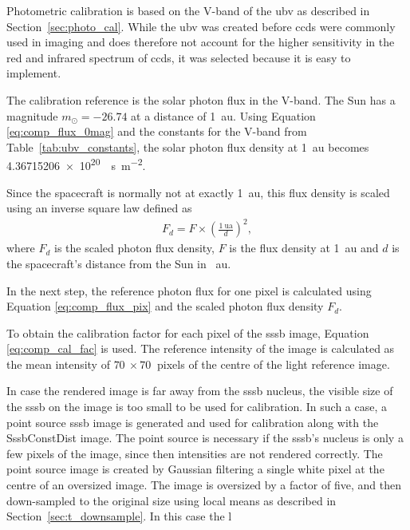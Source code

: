 Photometric calibration is based on the V-band of the \gls{ubv} as described in Section~\ref{sec:photo_cal}. While the \gls{ubv} was created before \glspl{ccd} were commonly used in imaging and does therefore not account for the higher sensitivity in the red and infrared spectrum of \glspl{ccd}, it was selected because it is easy to implement. 

The calibration reference is the solar photon flux in the V-band. The Sun has a magnitude $m_{\odot} = -26.74$ at a distance of \SI{1}{\astronomicalunit}. Using Equation \ref{eq:comp_flux_0mag} and the constants for the V-band from Table~\ref{tab:ubv_constants}, the solar photon flux density at \SI{1}{\astronomicalunit} becomes \SI{4.36715206e+20}{\per\second\per\square\meter}.
 
Since the spacecraft is normally not at exactly \SI{1}{\astronomicalunit}, this flux density is scaled using an inverse square law defined as
\begin{align}
    F_d = F \times \left(\frac{\SI{1}{\astronomicalunit}}{d}\right)^2, \label{eq:inverse_square}
\end{align}
where $F_d$ is the scaled photon flux density, $F$ is the flux density at \SI{1}{\astronomicalunit} and $d$ is the spacecraft's distance from the Sun in \SI{}{\astronomicalunit}.

In the next step, the reference photon flux for one pixel is calculated using Equation \ref{eq:comp_flux_pix} and the scaled photon flux density $F_d$.

To obtain the calibration factor for each pixel of the \gls{sssb} image, Equation \ref{eq:comp_cal_fac} is used. The reference intensity of the image is calculated as the mean intensity of $\SI{70}{}\times\SI{70}{}$ pixels of the centre of the light reference image.

In case the rendered image is far away from the \gls{sssb} nucleus, the visible size of the \gls{sssb} on the image is too small to be used for calibration. In such a case, a point source \gls{sssb} image is generated and used for calibration along with the SssbConstDist image. The point source is necessary if the \gls{sssb}'s nucleus is only a few pixels of the image, since then intensities are not rendered correctly. The point source image is created by Gaussian filtering a single white pixel at the centre of an oversized image. The image is oversized by a factor of five, and then down-sampled to the original size using local means as described in Section~\ref{sec:t_downsample}. In this case the l

